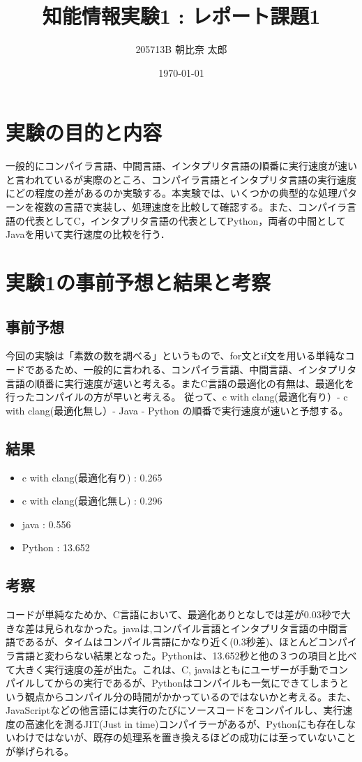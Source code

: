 \documentclass[a4paper, 11pt, titlepage]{jsarticle}
\title {知能情報実験1 : レポート課題1}
\author{205713B  朝比奈 太郎}
\date{\today }
\begin{document}
\maketitle
\tableofcontents
\clearpage

\section{実験の目的と内容}
一般的にコンパイラ言語、中間言語、インタプリタ言語の順番に実行速度が速いと言われているが実際のところ、コンパイラ言語とインタプリタ言語の実行速度にどの程度の差があるのか実験する。本実験では、いくつかの典型的な処理パターンを複数の言語で実装し、処理速度を比較して確認する。また、コンパイラ言語の代表としてC，インタプリタ言語の代表としてPython，両者の中間としてJavaを用いて実行速度の比較を行う．

\section{実験1の事前予想と結果と考察}
\subsection{事前予想}
今回の実験は「素数の数を調べる」というもので、for文とif文を用いる単純なコードであるため、一般的に言われる、コンパイラ言語、中間言語、インタプリタ言語の順番に実行速度が速いと考える。またC言語の最適化の有無は、最適化を行ったコンパイルの方が早いと考える。
従って、c with clang(最適化有り）-  c with clang(最適化無し）-  Java -  Python
の順番で実行速度が速いと予想する。
\subsection{結果}
\begin{itemize}
\item c with clang(最適化有り) : 0.265
\item c with clang(最適化無し) : 0.296
\item java : 0.556
\item Python : 13.652
\end{itemize}
\subsection{考察}
コードが単純なためか、C言語において、最適化ありとなしでは差が0.03秒で大きな差は見られなかった。javaは,コンパイル言語とインタプリタ言語の中間言語であるが、タイムはコンパイル言語にかなり近く(0.3秒差)、ほとんどコンパイラ言語と変わらない結果となった。Pythonは、13.652秒と他の３つの項目と比べて大きく実行速度の差が出た。これは、C, javaはともにユーザーが手動でコンパイルしてからの実行であるが、Pythonはコンパイルも一気にできてしまうという観点からコンパイル分の時間がかかっているのではないかと考える。また、JavaScriptなどの他言語には実行のたびにソースコードをコンパイルし、実行速度の高速化を測るJIT(Just in time)コンパイラーがあるが、Pythonにも存在しないわけではないが、既存の処理系を置き換えるほどの成功には至っていないことが挙げられる。
\end{document}

